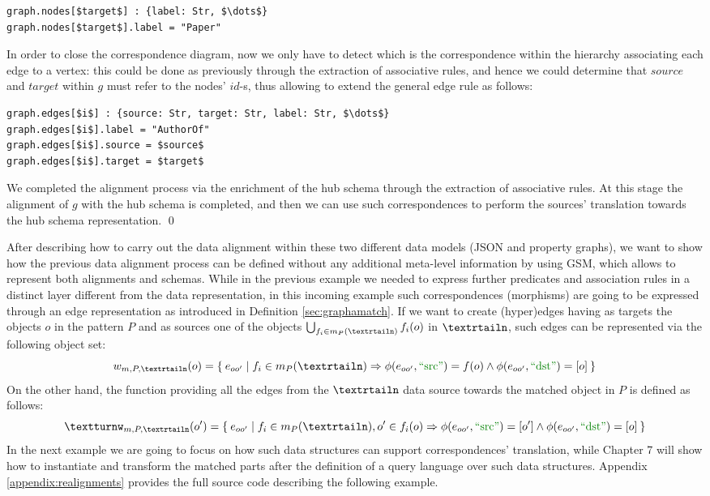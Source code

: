\begin{example}[label=ex:examplegraphdata]
\begin{lstlisting}[language=theoryjson,basicstyle=\ttfamily\small,mathescape=true]
graph.nodes[$target$] : {label: Str, $\dots$}
graph.nodes[$target$].label = "Paper"
\end{lstlisting}
In order to close the correspondence diagram, now we only have to detect which is the correspondence within the hierarchy associating each edge to a vertex: this could be done as previously through the extraction of associative rules, and hence we could determine that $source$ and $target$ within $g$ must refer to the nodes' $id$-s, thus allowing to extend the general edge rule as follows:
\begin{lstlisting}[language=theoryjson,basicstyle=\ttfamily\small,mathescape=true]
graph.edges[$i$] : {source: Str, target: Str, label: Str, $\dots$}
graph.edges[$i$].label = "AuthorOf"
graph.edges[$i$].source = $source$
graph.edges[$i$].target = $target$
\end{lstlisting}
We completed the alignment process via the enrichment of the hub schema through the extraction of associative rules. At this stage the alignment of $g$ with the hub schema is completed, and then we can use such correspondences to perform the sources' translation towards the hub schema representation. \qed
\end{example}
 

After describing how to carry out the data alignment within these two different data models (JSON and property graphs), we want to show how the previous data alignment process can be defined without any additional meta-level information by using GSM, which allows to represent both alignments and schemas. While in the previous example we needed to express further predicates and association rules in a distinct layer different from the data representation, in this incoming example such correspondences (morphisms)  are going to be expressed through an edge representation  as introduced in Definition \vref{sec:graphamatch}. If we want to create (hyper)edges having as targets the objects $o$ in the pattern $P$ and as sources one of the objects $\bigcup_{f_i\in m_P(\nested)}f_i(o)$ in $\nested$, such edges can be represented via the following object set:
\[w_{m,P,\nested}(o)=\Set{e_{oo'}|f_i\in m_P(\nested)\Rightarrow\phi(e_{oo'},\SRC)=f(o)\wedge \phi(e_{oo'},\DST)=[o]}\]
On the other hand, the function providing all the edges from the $\nested$ data source towards the matched object in $P$ is defined as follows:
\[\smatch_{m,P,\nested}(o')=\Set{e_{oo'}|f_i\in m_P(\nested), o'\in f_i(o)\Rightarrow\phi(e_{oo'},\SRC)=[o']\wedge \phi(e_{oo'},\DST)=[o]}\]
In the next example we are going to focus on how such data structures can support  correspondences' translation, while Chapter 7 will show how to instantiate and transform the matched parts after the definition of a query language over such data structures. Appendix \vref{appendix:realignments} provides the full source code describing  the following  example. 

